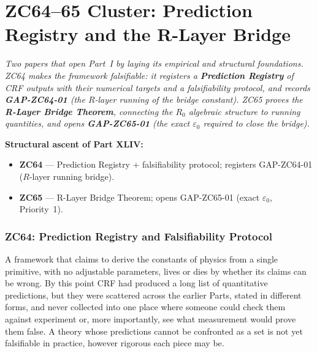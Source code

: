\documentclass[12pt, a4paper]{article}
\begin{document}
\part{ZC64--65 Cluster: Prediction Registry and the R-Layer Bridge}
\label{part:zc64-65}

\noindent
\textit{Two papers that open Part~I by laying its empirical and structural
foundations. ZC64 makes the framework falsifiable: it registers a
\textbf{Prediction Registry} of CRF outputs with their numerical
targets and a falsifiability protocol, and records
\textbf{GAP-ZC64-01} (the $R$-layer running of the bridge constant).
ZC65 proves the \textbf{R-Layer Bridge Theorem}, connecting the
$R_0$ algebraic structure to running quantities, and opens
\textbf{GAP-ZC65-01} (the exact $\varepsilon_0$ required to close
the bridge).}

\medskip
\textbf{Structural ascent of Part XLIV:}
\begin{itemize}[leftmargin=1.5em]
\item \textbf{ZC64} --- Prediction Registry + falsifiability protocol; registers GAP-ZC64-01 ($R$-layer running bridge).
\item \textbf{ZC65} --- R-Layer Bridge Theorem; opens GAP-ZC65-01 (exact $\varepsilon_0$, Priority~1).
\end{itemize}

\bigskip

\section{ZC64: Prediction Registry and Falsifiability Protocol}

A framework that claims to derive the constants of physics from a single
primitive, with no adjustable parameters, lives or dies by whether its claims
can be wrong. By this point CRF had produced a long list of quantitative
predictions, but they were scattered across the earlier Parts, stated in
different forms, and never collected into one place where someone could check
them against experiment or, more importantly, see what measurement would prove
them false. A theory whose predictions cannot be confronted as a set is not yet
falsifiable in practice, however rigorous each piece may be.
\end{document}
